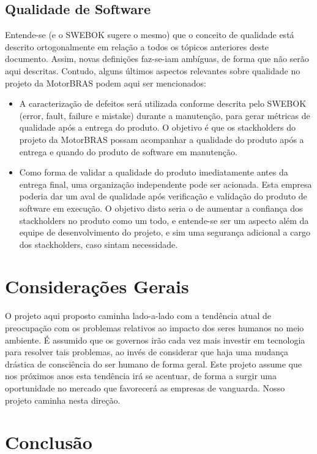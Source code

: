 \documentclass[12pt,journal,compsoc]{IEEEtran}
\begin{document}
\subsection{Qualidade de Software}

Entende-se (e o SWEBOK \cite{society_software_2004} sugere o mesmo) que o conceito de qualidade está descrito ortogonalmente em relação a todos os tópicos anteriores deste documento. Assim, novas de‌finições faz-se-iam ambíguas, de forma que não serão aqui descritas. Contudo, alguns últimos aspectos relevantes sobre qualidade no projeto da MotorBRAS podem aqui ser mencionados:

\begin{itemize}
\item A caracterização de defeitos será utilizada conforme descrita pelo SWEBOK \cite{society_software_2004} (error, fault, failure e mistake) durante a manutenção, para gerar métricas de qualidade após a entrega do produto. O objetivo é que os stackholders do projeto da MotorBRAS possam acompanhar a qualidade do produto após a entrega e quando do produto de software em manutenção.
\item Como forma de validar a qualidade do produto imediatamente antes da entrega final, uma organização independente pode ser acionada. Esta empresa poderia dar um aval de qualidade após verificação e validação do produto de software em execução. O objetivo disto seria o de aumentar a confiança dos stackholders no produto como um todo, e entende-se ser um aspecto além da equipe de desenvolvimento do projeto, e sim uma segurança adicional a cargo dos stackholders, caso sintam necessidade. 
\end{itemize}


\section{Considerações Gerais}

O projeto aqui proposto caminha lado-a-lado com a tendência atual de preocupação com os problemas relativos ao impacto dos seres humanos no meio ambiente. É assumido que os governos irão cada vez mais investir em tecnologia para resolver tais problemas, ao invés de considerar que haja uma mudança drástica de consciência do ser humano de forma geral. Este projeto assume que nos próximos anos esta tendência irá se acentuar, de forma a surgir uma oportunidade no mercado que favorecerá as empresas de vanguarda. Nosso projeto caminha nesta direção. 


\section{Conclusão}
\end{document}
